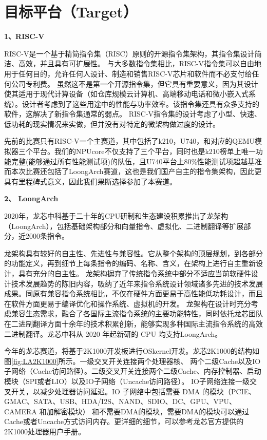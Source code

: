 \section{目标平台（Target）}

\textbf{1、RISC-V}

RISC-V是一个基于精简指令集（RISC）原则的开源指令集架构，其指令集设计简洁、高效，并且具有可扩展性。
与大多数指令集相比，RISC-V指令集可以自由地用于任何目的，允许任何人设计、制造和销售RISC-V芯片和软件而不必支付给任何公司专利费。
虽然这不是第一个开源指令集，但它具有重要意义，因为其设计使其适用于现代计算设备（如仓库规模云计算机、高端移动电话和微小嵌入式系统）。设计者考虑到了这些用途中的性能与功率效率。该指令集还具有众多支持的软件，这解决了新指令集通常的弱点。
RISC-V指令集的设计考虑了小型、快速、低功耗的现实情况来实做，但并没有对特定的微架构做过度的设计。

先前的比赛只有RISC-V一个主赛道，其中包括了k210，U740，和对应的QEMU模拟器三个平台。我们的NPUcore不仅支持了三个平台，同时也是k210榜单上唯一功能完整(能够通过所有性能测试项)的队伍，且U740平台上80\%性能测试项超越基准
而本次比赛还包括了LoongArch赛道，这也是我们国产自主的指令集架构，因此更具有里程碑式意义，因此我们果断选择参加了本赛道。

\textbf{2、 LoongArch}

2020年，龙芯中科基于二十年的CPU研制和生态建设积累推出了龙架构（LoongArch），包括基础架构部分和向量指令、虚拟化、二进制翻译等扩展部分，近2000条指令。

龙架构具有较好的自主性、先进性与兼容性。它从整个架构的顶层规划，到各部分的功能定义，再到细节上每条指令的编码、名称、含义，在架构上进行自主重新设计，具有充分的自主性。
龙架构摒弃了传统指令系统中部分不适应当前软硬件设计技术发展趋势的陈旧内容，吸纳了近年来指令系统设计领域诸多先进的技术发展成果。同原有兼容指令系统相比，不仅在硬件方面更易于高性能低功耗设计，而且在软件方面更易于编译优化和操作系统、虚拟机的开发。
龙架构在设计时充分考虑兼容生态需求，融合了各国际主流指令系统的主要功能特性，同时依托龙芯团队在二进制翻译方面十余年的技术积累创新，能够实现多种国际主流指令系统的高效二进制翻译。龙芯中科从 2020 年起新研的 CPU 均支持LoongArch。

今年的龙芯赛道，将基于2K1000开发板进行OSkernel开发。龙芯2K1000的结构如图\ref{fig:LA2K1000}所示。一级交叉开关连接两个处理器核、
两个二级Cache以及IO子网络（Cache访问路径）。二级交叉开关连接两个二级Cache、内存控制器、启动模块（SPI或者LIO）以及IO子网络（Uncache访问路径）。
IO子网络连接一级交叉开关，以减少处理器访问延迟。IO 子网络中包括需要 DMA 的模块（PCIE、GMAC、SATA、USB、HDA/I2S、NAND、SDIO、DC、GPU、VPU、CAMERA 和加解密模块）
和不需要DMA的模块，需要DMA的模块可以通过Cache或者Uncache方式访问内存。更详细的细节，可以参考龙芯官方提供的2K1000处理器用户手册。

